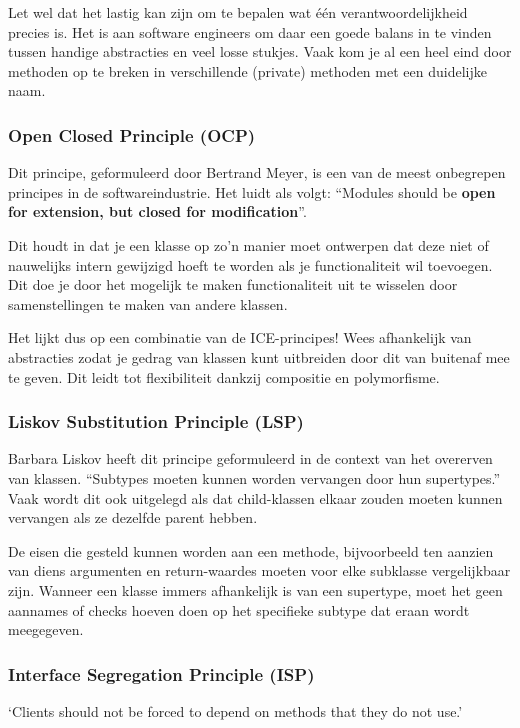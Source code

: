 \documentclass[dutch,a4paper,12pt,doubleside]{book}
\begin{document}
Let wel dat het lastig kan zijn om te bepalen wat één
verantwoordelijkheid precies is. Het is aan software engineers om daar een 
goede balans in te vinden tussen handige abstracties en veel losse stukjes.
Vaak kom je al een heel eind door methoden op te breken in verschillende 
(private) methoden met een duidelijke naam.

\subsubsection{Open Closed Principle (OCP)}
Dit principe, geformuleerd door Bertrand Meyer, 
is een van de meest onbegrepen principes in 
de softwareindustrie.
Het luidt als volgt: ``Modules should be 
\textbf{open for extension, but closed for modification}''.

Dit houdt in dat je een klasse op zo'n manier moet ontwerpen
dat deze niet of nauwelijks intern gewijzigd hoeft te worden 
als je functionaliteit wil toevoegen. Dit doe je door het mogelijk 
te maken functionaliteit uit te wisselen door samenstellingen te 
maken van andere klassen.

Het lijkt dus op een combinatie van de ICE-principes!
Wees afhankelijk van abstracties zodat je gedrag van klassen
kunt uitbreiden door dit van buitenaf mee te geven.
Dit leidt tot flexibiliteit dankzij compositie en 
polymorfisme.

\subsubsection{Liskov Substitution Principle (LSP)}
Barbara Liskov heeft dit principe geformuleerd in de context 
van het overerven van klassen. ``Subtypes moeten kunnen worden 
vervangen door hun supertypes.'' Vaak wordt dit ook uitgelegd 
als dat child-klassen elkaar zouden moeten kunnen vervangen als 
ze dezelfde parent hebben.

De eisen die gesteld kunnen worden aan een methode, bijvoorbeeld 
ten aanzien van diens argumenten en return-waardes moeten voor 
elke subklasse vergelijkbaar zijn. Wanneer een klasse immers 
afhankelijk is van een supertype,
moet het geen aannames of checks hoeven doen op het specifieke 
subtype dat eraan wordt meegegeven.

\subsubsection{Interface Segregation Principle (ISP)}
`Clients should not be forced to depend on methods 
that they do not use.'
\end{document}
